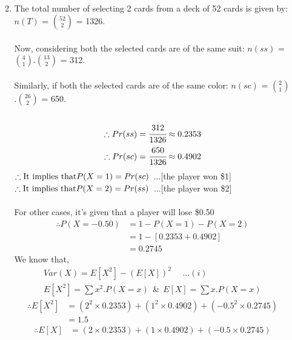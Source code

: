 \documentclass{article}
\begin{document}
\begin{enumerate}
\begin{enumerate}
\begin{enumerate}
\[            \]\\
        \end{enumerate}
    \item
        The total number of selecting 2 cards from a deck of 52 cards is given by: \(n(T)\) = \(\binom{52}{2}\) = 1326.\\\\
        Now, considering both the selected cards are of the same suit: \(n(ss)\) = \(\binom{4}{1}\).\(\binom{13}{2}\) = 312.\\\\
        Similarly, if both the selected cards are of the same color: \(n(sc)\) = \(\binom{2}{1}\).\(\binom{26}{2}\) = 650.\\\\
        \begin{align*}
            \therefore Pr(ss) = \cfrac{312}{1326} \approx 0.2353\\
            \therefore Pr(sc) = \cfrac{650}{1326} \approx 0.4902\\
        \end{align*}
        \(\therefore \textnormal{It implies that} P(X=1) = Pr(sc)\)\ ...[the player won \$1]\\
        \(\therefore \textnormal{It implies that} P(X=2) = Pr(ss)\)\ ...[the player won \$2]\\\\
        For other cases, it's given that a player will lose \$0.50
        \begin{align*}
        \therefore P(X= -0.50) &= 1 - P(X=1) - P(X=2)\\
        &= 1- [0.2353 + 0.4902]\\
        &= 0.2745
        \end{align*}
        We know that,
        \begin{align*}
            Var(X) = E[X^2] - (E[X])^2\ \ \ \ \ \ ...(i)\\
            E[X^2] = \sum x^2.P(X=x)\ \ \& \ \ E[X] = \sum x.P(X=x)
        \end{align*}
        \begin{align*}
            \therefore  E[X^2] &= (2^2\times 0.2353) + (1^2\times 0.4902) + (-0.5^2\times 0.2745)\\
            &= 1.5
        \end{align*}
        \begin{align*}
            \therefore  E[X] &= (2\times 0.2353) + (1\times 0.4902) + (-0.5\times 0.2745)\\

\end{align*}
\end{enumerate}
\end{enumerate}
\end{document}
